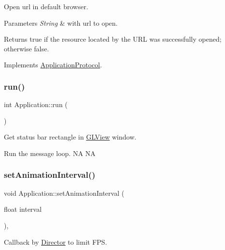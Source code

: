 Open url in default browser. 


\begin{DoxyParams}{Parameters}
{\em String} & with url to open. \\
\hline
\end{DoxyParams}
\begin{DoxyReturn}{Returns}
true if the resource located by the U\+RL was successfully opened; otherwise false. 
\end{DoxyReturn}


Implements \hyperlink{classApplicationProtocol_a152a977b301a90253ec5a6533b2e8e04}{Application\+Protocol}.

\mbox{\label{classApplication_a8cf8941c8db90117d3735bce5ae1fdf4}} 
\subsubsection{\texorpdfstring{run()}{run()}}
{\footnotesize\ttfamily int Application\+::run (\begin{DoxyParamCaption}{ }\end{DoxyParamCaption})}



Get status bar rectangle in \hyperlink{classGLView}{G\+L\+View} window. 

Run the message loop.  NA  NA \mbox{\label{classApplication_a760516339314580f5086173d006483cc}} 
\subsubsection{\texorpdfstring{set\+Animation\+Interval()}{setAnimationInterval()}\hspace{0.1cm}{\footnotesize\ttfamily [1/12]}}
{\footnotesize\ttfamily void Application\+::set\+Animation\+Interval (\begin{DoxyParamCaption}\item[{float}]{interval }\end{DoxyParamCaption})\hspace{0.3cm}{\ttfamily [override]}, {\ttfamily [virtual]}}



Callback by \hyperlink{classDirector}{Director} to limit F\+PS. 


